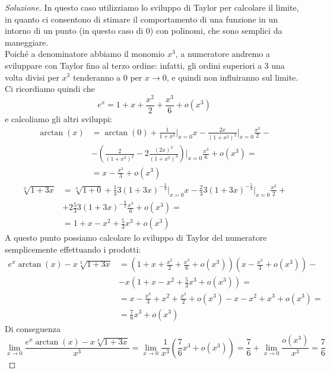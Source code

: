 \begin{proof}[Soluzione]
    In questo caso utilizziamo lo sviluppo di Taylor per calcolare il limite, in quanto ci consentono di stimare il comportamento di una funzione in un intorno di un punto (in questo caso di 0) con polinomi, che sono semplici da maneggiare.\\
    Poiché a denominatore abbiamo il monomio $x^3$, a numeratore andremo a sviluppare con Taylor fino al terzo ordine: infatti, gli ordini superiori a 3 una volta divisi per $x^3$ tenderanno a $0$ per $x\to 0$, e quindi non influiranno sul limite. Ci ricordiamo quindi che 
    \[
    e^x = 1 + x + \frac{x^2}{2}+\frac{x^3}{6}+o(x^3)
    \]
    e calcoliamo gli altri sviluppi:
    \[
    \begin{split}
        \arctan(x) & = \arctan(0)+\frac{1}{1+x^2}\bigg|_{x=0}x -\frac{2x}{(1+x^2)^2}\bigg|_{x=0}\frac{x^2}{2}-\\
        & - \left(\frac{2}{(1+x^2)^2}-2\frac{(2x)^2}{(1+x^2)^3}\right)\bigg|_{x=0}\frac{x^3}{6}+o(x^3) = \\
        & = x-\frac{x^3}{3}+o(x^3)
    \end{split}
    \]
    \[
    \begin{split}
        \sqrt[3]{1+3x} & = \sqrt[3]{1+0}+\frac{1}{3}3(1+3x)^{-\frac{2}{3}}\bigg|_{x=0}x -\frac{2}{3}3(1+3x)^{-\frac{5}{3}}\bigg|_{x=0}\frac{x^2}{2}+\\
        & + 2\frac{5}{3}3(1+3x)^{-\frac{8}{3}}\frac{x^3}{6}+o(x^3) = \\
        & = 1 + x-x^2 + \frac{5}{3}x^3+o(x^3)
    \end{split}
    \]
    A questo punto possiamo calcolare lo sviluppo di Taylor del numeratore semplicemente effettuando i prodotti:
    \[
    \begin{split}
        e^x\arctan(x)-x\sqrt[3]{1+3x} & = \left(1+x+\frac{x^2}{2}+\frac{x^3}{6}+o(x^3)\right)\left(x-\frac{x^3}{3}+o(x^3)\right)-\\
        & - x\left(1+x-x^2+\frac{5}{3}x^3+o(x^3)\right) = \\
        & = x-\frac{x^3}{3}+x^2 + \frac{x^3}{2} + o(x^3)-x-x^2+x^3+o(x^3) =\\
        & = \frac{7}{6}x^3+o(x^3)
    \end{split}
    \]
    Di conseguenza
    \[
    \lim_{x\to 0} \frac{e^x\arctan(x)-x\sqrt[3]{1+3x}}{x^3} = \lim_{x\to 0} \frac{1}{x^3}\left(\frac{7}{6}x^3 +o(x^3)\right) = \frac{7}{6} +\lim_{x\to 0}\frac{o(x^3)}{x^3} = \frac{7}{6}
    \]
\end{proof}
